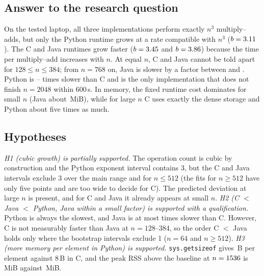 \documentclass[conference,a4paper]{IEEEtran}
\begin{document}
\subsection{Answer to the research question}
On the tested laptop, all three implementations perform exactly $n^3$ multiply--adds, but only the Python runtime
grows at a rate compatible with $n^3$ ($b=3.11$). The C and Java runtimes grow faster ($b=3.45$ and
$b=3.86$) because the time per multiply--add increases with $n$. At equal $n$, C and Java cannot be told apart
for $128\le n\le384$; from $n=768$ on, Java is slower by a factor between \RatioJavaSevenSixtyEight{} and
\RatioJavaFifteenThirtySix{}. Python is \RatioPythonMin{}--\RatioPythonMax{} times slower than C and is the only
implementation that does not finish $n=2048$ within 600\,s. In memory, the fixed runtime cost dominates for small
$n$ (Java about \RssBaseJava{}\,MiB), while for large $n$ C uses exactly the dense storage and Python about five
times as much.

\subsection{Hypotheses}
\emph{H1 (cubic growth) is partially supported.} The operation count is cubic by construction and the Python
exponent interval contains 3, but the C and Java intervals exclude 3 over the main range and for $n\le512$ (the
fits for $n\ge512$ have only five points and are too wide to decide for C). The predicted
deviation at large $n$ is present, and for C and Java it already appears at small $n$.
\emph{H2 (C $<$ Java $<$ Python, Java within a small factor) is supported with a qualification.} Python is always
the slowest, and Java is at most \RatioJavaMax{} times slower than C. However, C is not measurably faster than Java
at $n=128$--384, so the order C $<$ Java holds only where the bootstrap intervals exclude 1 ($n=64$ and $n\ge512$).
\emph{H3 (more memory per element in Python) is supported.} \texttt{sys.getsizeof} gives \MemMetricBpePython{}\,B
per element against 8\,B in C, and the peak RSS above the baseline at $n=1536$ is \RssNetCommonPython{}\,MiB
against \RssNetCommonC{}\,MiB.
\end{document}
